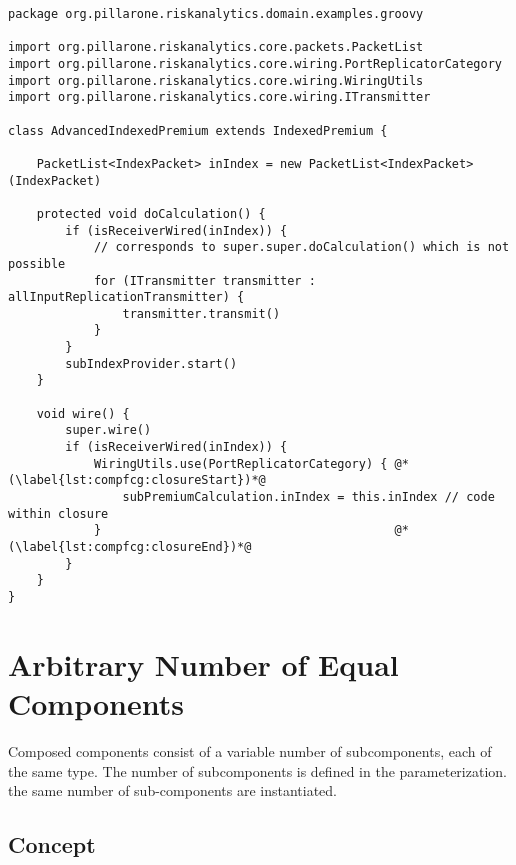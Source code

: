 \begin{lstlisting}[label=lst:compfcg]
package org.pillarone.riskanalytics.domain.examples.groovy

import org.pillarone.riskanalytics.core.packets.PacketList
import org.pillarone.riskanalytics.core.wiring.PortReplicatorCategory
import org.pillarone.riskanalytics.core.wiring.WiringUtils
import org.pillarone.riskanalytics.core.wiring.ITransmitter

class AdvancedIndexedPremium extends IndexedPremium {

    PacketList<IndexPacket> inIndex = new PacketList<IndexPacket>(IndexPacket)

    protected void doCalculation() {
        if (isReceiverWired(inIndex)) {
            // corresponds to super.super.doCalculation() which is not possible
            for (ITransmitter transmitter : allInputReplicationTransmitter) {
                transmitter.transmit()
            }
        }
        subIndexProvider.start()
    }

    void wire() {
        super.wire()
        if (isReceiverWired(inIndex)) {
            WiringUtils.use(PortReplicatorCategory) { @*(\label{lst:compfcg:closureStart})*@
                subPremiumCalculation.inIndex = this.inIndex // code within closure
            }                                         @*(\label{lst:compfcg:closureEnd})*@
        }
    }
}\end{lstlisting}

\section{Arbitrary Number of Equal Components}
\label{par:mulequcom}

Composed components consist of a variable number of subcomponents, each of the same type.
The number of subcomponents is defined in the parameterization.
the same number of sub-components are instantiated.

\subsection*{Concept}
\label{subpar:dyncompcomp}

